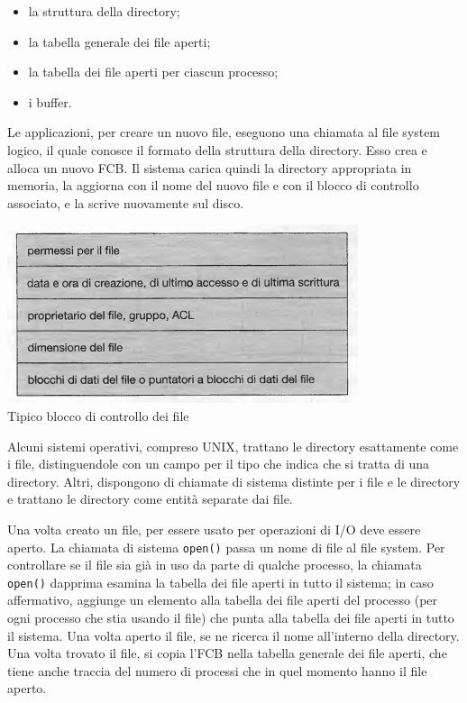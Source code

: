 \documentclass[11pt,a4paper]{article}
\begin{document}
{\begin{itemize}
  \item la struttura della directory;
  \item la tabella generale dei file aperti;
  \item la tabella dei file aperti per ciascun processo;
  \item i buffer.
\end{itemize}
Le applicazioni, per creare un nuovo file, eseguono una chiamata al file system logico, il
quale conosce il formato della struttura della directory. Esso crea e alloca un nuovo FCB. Il sistema carica quindi la directory appropriata in memoria, la aggiorna con il nome del nuovo file e con il
blocco di controllo associato, e la scrive nuovamente sul disco.
\begin{center}
  \includegraphics[scale=0.6]{img/0053.png}\\
  \caption{Tipico blocco di controllo dei file}
\end{center}
Alcuni sistemi operativi, compreso UNIX, trattano le directory esattamente come i file, di­stinguendole con un campo per il tipo che indica che si tratta di una directory. Altri, dispongono di chiamate di sistema distinte per i file e le directory e trattano le directory come entità separate dai file.

Una volta creato un file, per essere usato per operazioni di I/O deve essere aperto. La
chiamata di sistema \texttt{open()} passa un nome di file al file system. Per controllare se il file sia
già in uso da parte di qualche processo, la chiamata \texttt{open()} dapprima esamina la tabella dei
file aperti in tutto il sistema; in caso affermativo, aggiunge un elemento alla tabella dei file
aperti del processo (per ogni processo che stia usando il file) che punta alla tabella dei file
aperti in tutto il sistema. Una volta aperto il file, se ne ricerca il nome all'interno della directory.
Una volta trovato il file, si copia l'FCB nella tabella generale dei file aperti, che tiene anche traccia del numero di processi che in quel momento hanno il file aperto.

}
\end{document}
